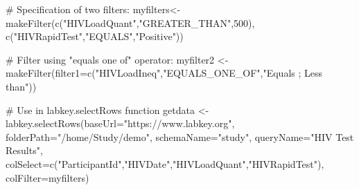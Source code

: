 \begin{Examples}
\begin{ExampleCode}

# Specification of two filters:
myfilters<- makeFilter(c("HIVLoadQuant","GREATER_THAN",500), c("HIVRapidTest","EQUALS","Positive"))

# Filter using "equals one of" operator:
myfilter2 <- makeFilter(filter1=c("HIVLoadIneq","EQUALS_ONE_OF","Equals ; Less than"))

# Use in labkey.selectRows function
getdata <- labkey.selectRows(baseUrl="https://www.labkey.org", folderPath="/home/Study/demo", schemaName="study", queryName="HIV Test Results", colSelect=c("ParticipantId","HIVDate","HIVLoadQuant","HIVRapidTest"), colFilter=myfilters)


\end{ExampleCode}
\end{Examples}

